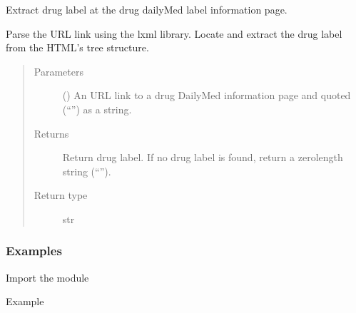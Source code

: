 \documentclass[letterpaper,10pt,english]{sphinxmanual}
\begin{document}
\begin{fulllineitems}
\label{\detokenize{biomarker_extraction:biomarker_extraction.drug_brand_label}}
\sphinxAtStartPar
Extract drug label at the drug dailyMed label information page.

\sphinxAtStartPar
Parse the URL link using the lxml library. Locate and extract the drug label from the HTML’s tree structure.
\begin{quote}\begin{description}
\item[{Parameters}] \leavevmode
\sphinxAtStartPar
{} () \textendash{} An URL link to a drug DailyMed information page
and quoted (“”) as a string.

\item[{Returns}] \leavevmode
\sphinxAtStartPar
Return drug label.
If no drug label is found, return a zero\sphinxhyphen{}length string (“”).

\item[{Return type}] \leavevmode
\sphinxAtStartPar
str

\end{description}\end{quote}
\subsubsection*{Examples}

\sphinxAtStartPar
Import the module

\begin{sphinxVerbatim}[commandchars=\\\{\}]
   
\end{sphinxVerbatim}

\sphinxAtStartPar
Example

\begin{sphinxVerbatim}[commandchars=\\\{\}]
  
  
\end{sphinxVerbatim}


\nopagebreak


\sphinxAtStartPar
{\hyperref[\detokenize{biomarker_extraction:biomarker_extraction.ndc_code}]{}}



\end{fulllineitems}
\end{document}
